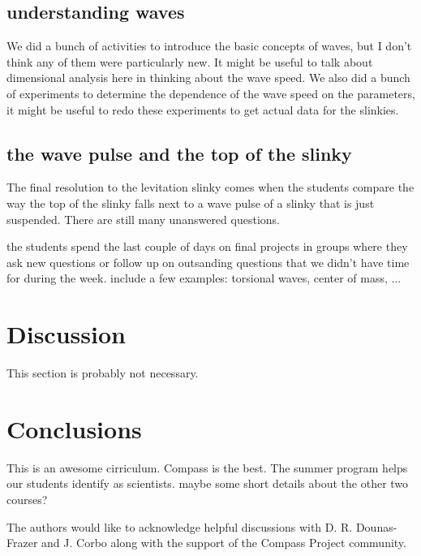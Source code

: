 \documentclass[aps,pre,10pt,superscriptaddress,showpacs,amsmath,amssymb,nofootinbib]{revtex4-1}
\begin{document}
\subsection{understanding waves}
 We did a bunch of activities to introduce the basic concepts of waves, but I
 don't think any of them were particularly new.  It might be useful to talk about
dimensional analysis here in thinking about the wave speed.  We also did
a bunch of experiments to determine the dependence of the wave speed on
the parameters, it might be useful to redo these experiments to get actual data
for the slinkies.

\subsection{the wave pulse and the top of the slinky }
The final resolution to the levitation slinky comes when the students compare
the way the top of the slinky falls next to a wave pulse of a slinky that is
just suspended.  There are still many unanswered questions.

the students spend the last couple of days on final projects in groups where
they ask new questions or follow up on outsanding questions that we didn't have
time for during the week. include a few examples: torsional waves, center of 
mass, ...


\section{Discussion}
This section is probably not necessary.



\section{Conclusions}
This is an awesome cirriculum.  Compass is the best.  The summer program helps
our students identify as scientists.  maybe some short details about the other
two courses?


\acknowledgments The authors would like to acknowledge helpful discussions with
D. R. Dounas-Frazer and J. Corbo along with the support of the Compass Project
community.


\end{document}
